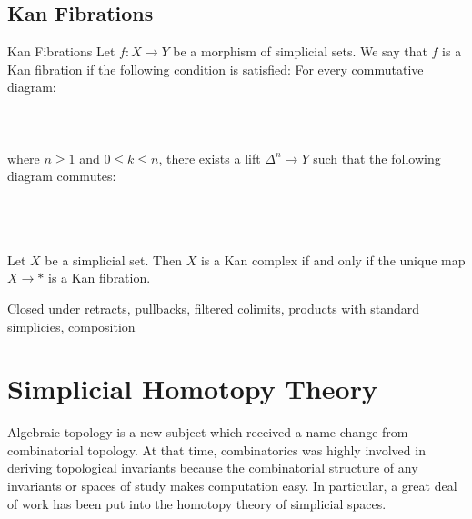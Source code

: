 \documentclass[a4paper]{article}
\begin{document}
\subsection{Kan Fibrations}
\begin{defn}{Kan Fibrations}{} Let $f:X\to Y$ be a morphism of simplicial sets. We say that $f$ is a Kan fibration if the following condition is satisfied: For every commutative diagram: \\~\\
\\~\\
where $n\geq 1$ and $0\leq k\leq n$, there exists a lift $\Delta^n\to Y$ such that the following diagram commutes: \\~\\
\\~\\
\end{defn}

\begin{lmm}{}{} Let $X$ be a simplicial set. Then $X$ is a Kan complex if and only if the unique map $X\to\ast$ is a Kan fibration. 
\end{lmm}

Closed under retracts, pullbacks, filtered colimits, products with standard simplicies, composition

\pagebreak
\section{Simplicial Homotopy Theory}
Algebraic topology is a new subject which received a name change from combinatorial topology. At that time, combinatorics was highly involved in deriving topological invariants because the combinatorial structure of any invariants or spaces of study makes computation easy. In particular, a great deal of work has been put into the homotopy theory of simplicial spaces. \\
\end{document}
